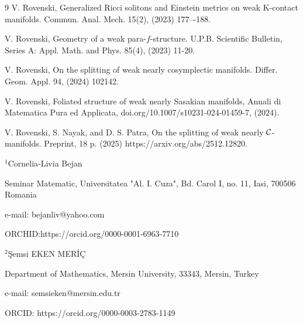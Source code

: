\documentclass{article}
\begin{document}
\begin{thebibliography}{9}
	 V. Rovenski, Generalized Ricci solitons and Einstein metrics on weak K-contact manifolds. Commun. Anal. Mech. 15(2), (2023) 177–-188.
	
	 V. Rovenski, Geometry of a weak para-$f$-structure. U.P.B. Scientific Bulletin, Series A: Appl. Math. and Phys. 85(4), (2023) 11-20.
	
	 V. Rovenski, On the splitting of weak nearly cosymplectic manifolds. Differ. Geom. Appl. 94, (2024) 102142.
	
	 V. Rovenski, Foliated structure of weak nearly Sasakian manifolds, Annali di Matematica Pura ed Applicata, doi.org/10.1007/s10231-024-01459-7, (2024).
	
	  V. Rovenski, S. Nayak, and D. S. Patra, On the splitting of weak nearly $\cal C$-manifolds. Preprint, 18 p. (2025) https://arxiv.org/abs/2512.12820.\bigskip
	
	$^{1}$Cornelia-Livia Bejan\smallskip
	
	Seminar Matematic, Universitatea "Al. I. Cuza", Bd. Carol I, no. 11, Iasi, 700506 Romania \smallskip
	
	e-mail: bejanliv@yahoo.com\smallskip
	
	ORCHID:https://orcid.org/0000-0001-6963-7710\medskip	
	
	
	$^{2}$\c{S}emsi EKEN MER{\.I}\c{C}\smallskip
	
	Department of Mathematics, Mersin University, 33343, Mersin, Turkey\smallskip
	
	e-mail: semsieken@mersin.edu.tr\smallskip
	
	ORCID: https://orcid.org/0000-0003-2783-1149
	

	

	
	

		


	
	
	
	
	

	

	

	
	 
	
	

	
\end{thebibliography}



	
\end{document}
